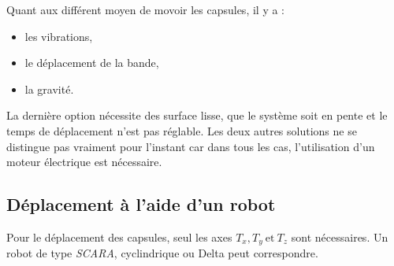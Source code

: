 Quant aux différent moyen de movoir les capsules, il y a : 
\begin{itemize}
    \item les vibrations, 
    \item le déplacement de la bande, 
    \item la gravité.
\end{itemize}

La dernière option nécessite des surface lisse, que le système soit en pente et le temps de déplacement n'est pas réglable. Les deux autres solutions ne se distingue pas vraiment pour l'instant car dans tous les cas, l'utilisation d'un moteur électrique est nécessaire.

\subsection*{Déplacement à l'aide d'un robot}
Pour le déplacement des capsules, seul les axes $T_x, T_y~\text{et}~T_z$ sont nécessaires. Un robot de type \textit{SCARA}, cyclindrique ou Delta peut correspondre.